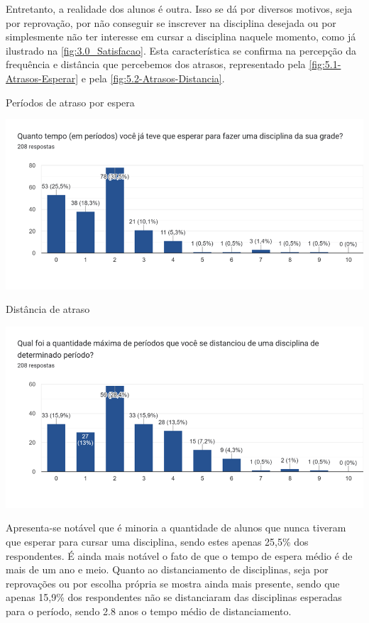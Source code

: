 Entretanto, a realidade dos alunos é outra. Isso se dá por diversos motivos, seja por reprovação, por não conseguir se inscrever na disciplina desejada ou por simplesmente não ter interesse em cursar a disciplina naquele momento, como já ilustrado na \autoref{fig:3.0_Satisfacao}. Esta característica se confirma na percepção da frequência e distância que percebemos dos atrasos, representado pela \autoref{fig:5.1-Atrasos-Esperar} e pela \autoref{fig:5.2-Atrasos-Distancia}.

\begin{MyCenteredFigure}
  \caption{Períodos de atraso por espera}
  \label{fig:5.1-Atrasos-Esperar}
  \includegraphics[width=\textwidth]{files/img/Forms/5.1-Atrasos-Esperar}
\end{MyCenteredFigure} %

\begin{MyCenteredFigure}
  \caption{Distância de atraso}
  \label{fig:5.2-Atrasos-Distancia}
  \includegraphics[width=\textwidth]{files/img/Forms/5.2-Atrasos-Distancia}
\end{MyCenteredFigure} %
Apresenta-se notável que é minoria a quantidade de alunos que nunca tiveram que esperar para cursar uma disciplina, sendo estes apenas 25,5\% dos respondentes. É ainda mais notável o fato de que o tempo de espera médio é de mais de um ano e meio. Quanto ao distanciamento de disciplinas, seja por reprovações ou por escolha própria se mostra ainda mais presente, sendo que apenas 15,9\% dos respondentes não se distanciaram das disciplinas esperadas para o período, sendo 2.8 anos o tempo médio de distanciamento.

